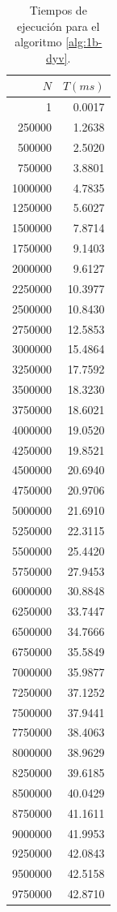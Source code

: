 \begin{table}
	\footnotesize
	\centering
	\begin{tabular}{|r|r|}
        \hline
        $N$ & $T(ms)$ \\
        \hline
		1 & 0.0017 \\ 
		250000 & 1.2638 \\ 
		500000 & 2.5020 \\ 
		750000 & 3.8801 \\ 
		1000000 & 4.7835 \\ 
		1250000 & 5.6027 \\ 
		1500000 & 7.8714 \\ 
		1750000 & 9.1403 \\ 
		2000000 & 9.6127 \\ 
		2250000 & 10.3977 \\ 
		2500000 & 10.8430 \\ 
		2750000 & 12.5853 \\ 
		3000000 & 15.4864 \\ 
		3250000 & 17.7592 \\ 
		3500000 & 18.3230 \\ 
		3750000 & 18.6021 \\ 
		4000000 & 19.0520 \\ 
		4250000 & 19.8521 \\ 
		4500000 & 20.6940 \\ 
		4750000 & 20.9706 \\ 
		5000000 & 21.6910 \\ 
		5250000 & 22.3115 \\ 
		5500000 & 25.4420 \\ 
		5750000 & 27.9453 \\ 
		6000000 & 30.8848 \\ 
		6250000 & 33.7447 \\ 
		6500000 & 34.7666 \\ 
		6750000 & 35.5849 \\ 
		7000000 & 35.9877 \\ 
		7250000 & 37.1252 \\ 
		7500000 & 37.9441 \\ 
		7750000 & 38.4063 \\ 
		8000000 & 38.9629 \\ 
		8250000 & 39.6185 \\ 
		8500000 & 40.0429 \\ 
		8750000 & 41.1611 \\ 
		9000000 & 41.9953 \\ 
		9250000 & 42.0843 \\ 
		9500000 & 42.5158 \\ 
		9750000 & 42.8710 \\ 
        \hline
	\end{tabular}
    \caption{Tiempos de ejecución para el algoritmo \ref{alg:1b-dyv}.}
    \label{tab:1b-dyv}
\end{table}

